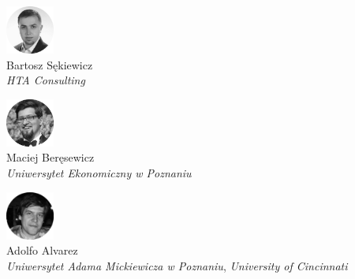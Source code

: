 \begin{minipage}[t]{0.33\textwidth}
	\center     
    \includegraphics[width=60px]{img/people/czarno_biale/bartosz-crop.png}   \\
    Bartosz Sękiewicz \\ 
    \textit{HTA Consulting}
\end{minipage}
\begin{minipage}[t]{0.33\textwidth}
	\center 
    \includegraphics[width=60px]{img/people/czarno_biale/maciej-crop.png}    \\
    Maciej Beręsewicz \\
	\textit{Uniwersytet Ekonomiczny w Poznaniu}  
\end{minipage}
\begin{minipage}[t]{0.33\textwidth}
	\center     
    \includegraphics[width=60px]{img/people/czarno_biale/adolfo-crop.png}   \\
    Adolfo Alvarez \\
	\textit{Uniwersytet Adama Mickiewicza w Poznaniu}, \textit{University of Cincinnati}
\end{minipage}

